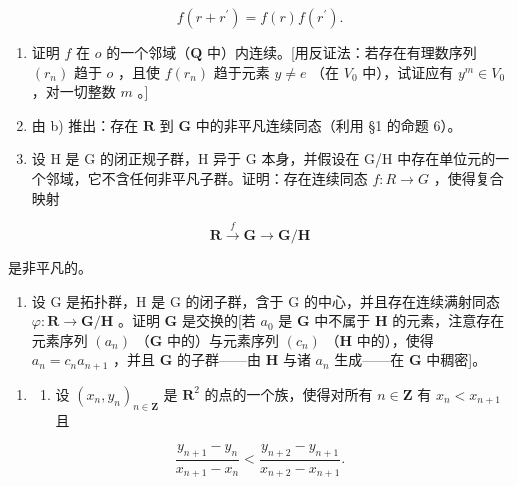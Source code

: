 \[
f (r + r ^ {\prime}) = f (r) f (r ^ {\prime}).
\]

\begin{enumerate}
\def\labelenumi{\alph{enumi})}
\setcounter{enumi}{1}
\item
  证明 \(f\) 在 \(o\) 的一个邻域（\(\mathbf{Q}\) 中）内连续。{[}用反证法：若存在有理数序列 \((r_n)\) 趋于 \(o\) ，且使 \(f(r_n)\) 趋于元素 \(y \neq e\) （在 \(V_0\) 中），试证应有 \(y^m \in V_0\) ，对一切整数 \(m\) 。{]}
\item
  由 b) 推出：存在 \(\mathbf{R}\) 到 \(\mathbf{G}\) 中的非平凡连续同态（利用 §1 的命题 6）。
\item
  设 H 是 G 的闭正规子群，H 异于 G 本身，并假设在 G/H 中存在单位元的一个邻域，它不含任何非平凡子群。证明：存在连续同态 \(f: R \rightarrow G\) ，使得复合映射
\end{enumerate}

\[
\mathbf {R} \xrightarrow {f} \mathbf {G} \to \mathbf {G} / \mathbf {H}
\]

是非平凡的。

\begin{enumerate}
\def\labelenumi{\arabic{enumi})}
\setcounter{enumi}{7}
\tightlist
\item
  设 G 是拓扑群，H 是 G 的闭子群，含于 G 的中心，并且存在连续满射同态 \(\varphi: \mathbf{R} \to \mathbf{G} / \mathbf{H}\) 。证明 \(\mathbf{G}\) 是交换的{[}若 \(a_0\) 是 \(\mathbf{G}\) 中不属于 \(\mathbf{H}\) 的元素，注意存在元素序列 \((a_n)\) （\(\mathbf{G}\) 中的）与元素序列 \((c_n)\) （\(\mathbf{H}\) 中的），使得 \(a_n = c_n a_{n+1}\) ，并且 \(\mathbf{G}\) 的子群——由 \(\mathbf{H}\) 与诸 \(a_n\) 生成——在 \(\mathbf{G}\) 中稠密{]}。
\end{enumerate}

\ExerciseSection

\begin{enumerate}
\def\labelenumi{\arabic{enumi})}
\tightlist
\item
  \begin{enumerate}
  \def\labelenumii{\alph{enumii})}
  \tightlist
  \item
    设 \((x_{n}, y_{n})_{n \in \mathbf{Z}}\) 是 \(\mathbf{R}^{2}\) 的点的一个族，使得对所有 \(n \in \mathbf{Z}\) 有 \(x_{n} < x_{n+1}\) 且
  \end{enumerate}
\end{enumerate}

\[
\frac {y _ {n + 1} - y _ {n}}{x _ {n + 1} - x _ {n}} <   \frac {y _ {n + 2} - y _ {n + 1}}{x _ {n + 2} - x _ {n + 1}}.
\]

